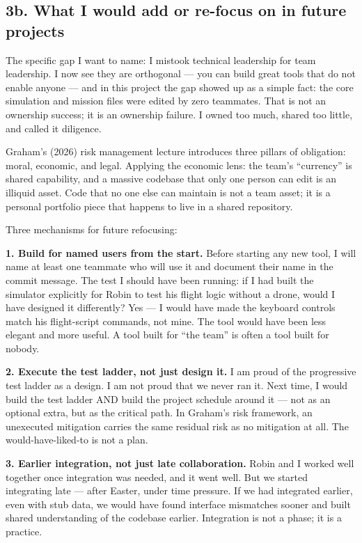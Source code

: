 \subsection{3b. What I would add or re-focus on in future projects}

The specific gap I want to name: I mistook technical leadership for team leadership. I now see they are orthogonal --- you can build great tools that do not enable anyone --- and in this project the gap showed up as a simple fact: the core simulation and mission files were edited by zero teammates. That is not an ownership success; it is an ownership failure. I owned too much, shared too little, and called it diligence.

Graham's (2026) risk management lecture introduces three pillars of obligation: moral, economic, and legal. Applying the economic lens: the team's ``currency'' is shared capability, and a massive codebase that only one person can edit is an illiquid asset. Code that no one else can maintain is not a team asset; it is a personal portfolio piece that happens to live in a shared repository.

Three mechanisms for future refocusing:

\textbf{1. Build for named users from the start.} Before starting any new tool, I will name at least one teammate who will use it and document their name in the commit message. The test I should have been running: if I had built the simulator explicitly for Robin to test his flight logic without a drone, would I have designed it differently? Yes --- I would have made the keyboard controls match his flight-script commands, not mine. The tool would have been less elegant and more useful. A tool built for ``the team'' is often a tool built for nobody.

\textbf{2. Execute the test ladder, not just design it.} I am proud of the progressive test ladder as a design. I am not proud that we never ran it. Next time, I would build the test ladder AND build the project schedule around it --- not as an optional extra, but as the critical path. In Graham's risk framework, an unexecuted mitigation carries the same residual risk as no mitigation at all. The would-have-liked-to is not a plan.

\textbf{3. Earlier integration, not just late collaboration.} Robin and I worked well together once integration was needed, and it went well. But we started integrating late --- after Easter, under time pressure. If we had integrated earlier, even with stub data, we would have found interface mismatches sooner and built shared understanding of the codebase earlier. Integration is not a phase; it is a practice.

